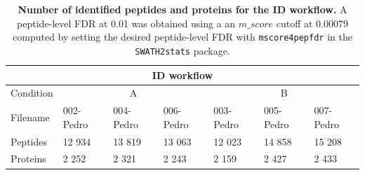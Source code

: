 \documentclass[11pt]{article}
\begin{document}
\begin{table}[h]
    \begin{tabular}{l|lll|lll}
    \hline
    \multicolumn{7}{c}{ID workflow}                                                                                                                                                                                   \\ \hline
    Condition & \multicolumn{3}{c|}{A}          & \multicolumn{3}{c}{B}                                                                         \\
    \hline
    Filename       & 002-Pedro & 004-Pedro & 006-Pedro & 003-Pedro & 005-Pedro & 007-Pedro \\
    \hline
    Peptides  & 12 934                        & 13 819                        & 13 063                        & 12 023                        & 14 858                        & 15 208                        \\
    Proteins  & 2 252                         & 2 321                         & 2 243                         & 2 159                         & 2 427                         & 2 433                         \\ \hline
    \end{tabular}
     \caption{{\bf Number of identified peptides and proteins for the ID workflow.} A peptide-level FDR at 0.01 was obtained using a an $m\_score$ cutoff at 0.00079 computed by setting the desired peptide-level FDR with \texttt{mscore4pepfdr} in the \texttt{SWATH2stats} package.
          \label{fig:osw_peptide_and_protein_id}}
\end{table}
        
\end{document}
